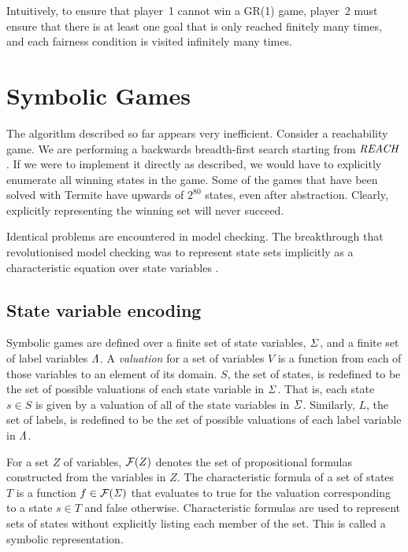 Intuitively, to ensure that player~1 cannot win a GR(1) game, player~2 must ensure that there is at least one goal that is only reached finitely many times, and each fairness condition is visited infinitely many times. 

\section{Symbolic Games}
\label{sec:symbolic_games}

The algorithm described so far appears very inefficient. Consider a reachability game. We are performing a backwards breadth-first search starting from $\mathit{REACH}$. If we were to implement it directly as described, we would have to explicitly enumerate all winning states in the game. Some of the games that have been solved with Termite have upwards of $2^{80}$ states, even after abstraction. Clearly, explicitly representing the winning set will never succeed. 

Identical problems are encountered in model checking. The breakthrough that revolutionised model checking was to represent state sets implicitly as a characteristic equation over state variables \cite{Burch_symbolic,McMillan_thesis}.

\subsection{State variable encoding}

Symbolic games are defined over a finite set of state variables, $\mathit{\Sigma}$, and a finite set of label variables $\mathit{\Lambda}$. A \emph{valuation} for a set of variables $V$ is a function from each of those variables to an element of its domain. $S$, the set of states, is redefined to be the set of possible valuations of each state variable in $\mathit{\Sigma}$. That is, each state $s \in S$ is given by a valuation of all of the state variables in $\mathit{\Sigma}$. Similarly, $L$, the set of labels, is redefined to be the set of possible valuations of each label variable in $\mathit{\Lambda}$.

For a set $Z$ of variables, $\mathcal{F}(Z)$ denotes the set of propositional formulas constructed from the variables in $Z$. The characteristic formula of a set of states $T$ is a function $f \in \mathcal{F}(\mathit{\Sigma})$ that evaluates to true for the valuation corresponding to a state $s \in T$ and false otherwise. Characteristic formulas are used to represent sets of states without explicitly listing each member of the set. This is called a symbolic representation. 

